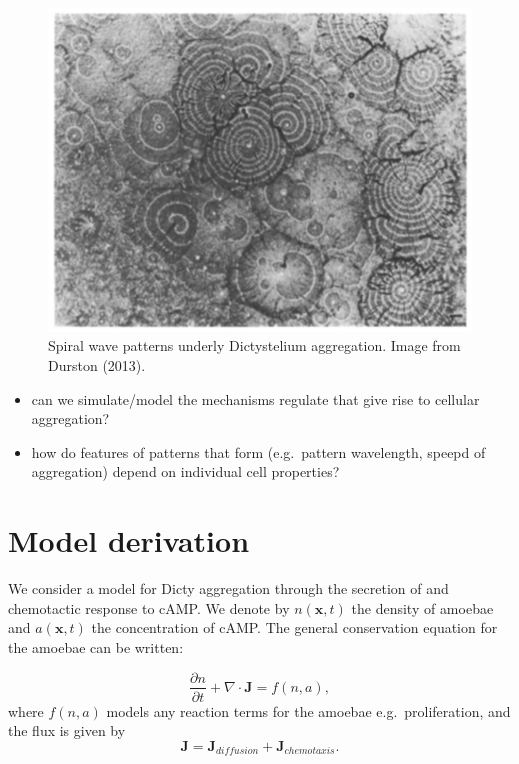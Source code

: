 \documentclass[
  letterpaper,
  DIV=11,
  numbers=noendperiod]{scrreprt}
\providecommand{\tightlist}{%
  \setlength{\itemsep}{0pt}\setlength{\parskip}{0pt}}\usepackage{longtable,booktabs,array}
\theoremstyle{plain}
\theoremstyle{definition}
\theoremstyle{plain}
\theoremstyle{remark}
\begin{document}
\begin{figure}

{\centering \includegraphics{CG-14-355_F2.jpg}

}

\caption{\label{fig-dicty_spiral}Spiral wave patterns underly
Dictystelium aggregation. Image from Durston (2013).}

\end{figure}

\begin{itemize}
\tightlist
\item
  can we simulate/model the mechanisms regulate that give rise to
  cellular aggregation?
\item
  how do features of patterns that form (e.g.~pattern wavelength, speepd
  of aggregation) depend on individual cell properties?
\end{itemize}

\hypertarget{model-derivation}{%
\section{Model derivation}\label{model-derivation}}

We consider a model for Dicty aggregation through the secretion of and
chemotactic response to cAMP. We denote by \(n({\mathbf{x}}, t)\) the
density of amoebae and \(a({\mathbf{x}}, t)\) the concentration of cAMP.
The general conservation equation for the amoebae can be written:

\[
\frac{\partial n}{\partial  t} + \nabla \cdot {\mathbf{J}} = f(n,a),
\] where \(f(n,a)\) models any reaction terms for the amoebae
e.g.~proliferation, and the flux is given by \[
{\mathbf{J}} = {\mathbf{J}}_{diffusion} + {\mathbf{J}}_{chemotaxis}.
\]
\end{document}
